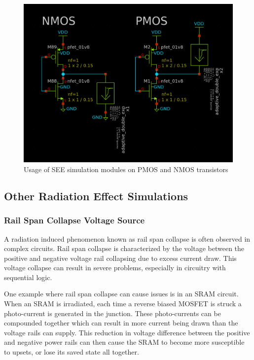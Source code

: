 \documentclass[conference]{IEEEtran}
\begin{document}
    \begin{figure}[htbp]
        \centering
        \includegraphics[width=0.9\linewidth]{PMOS_NMOS_Usage}
        \caption{Usage of SEE simulation modules on PMOS and NMOS transistors}
        \label{fig:SEE_Usage}
    \end{figure}

    \subsection{Other Radiation Effect Simulations}
    \label{subsec:other-radiation-effect-simulations}

    \subsubsection{Rail Span Collapse Voltage Source}
    A radiation induced phenomenon known as rail span collapse is often observed in complex circuits.
    Rail span collapse is characterized by the voltage between the positive and negative voltage rail collapsing due to excess current draw.
    This voltage collapse can result in severe problems, especially in circuitry with sequential logic.

    One example where rail span collapse can cause issues is in an SRAM circuit.
    When an SRAM is irradiated, each time a reverse biased MOSFET is struck a photo-current is generated in the junction.
    These photo-currents can be compounded together which can result in more current being drawn than the voltage rails can supply.
    This reduction in voltage difference between the positive and negative power rails can then cause the SRAM to become more susceptible to upsets, or lose its saved state all together.
\end{document}
